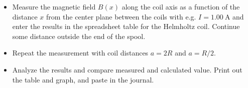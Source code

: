 \documentclass[../Elmag-labhefte-2020.tex]{subfiles}
\begin{document}
\begin{itemize}
\begin{marginfigure}
    \caption{%
        The Helmholtz coil circuit.
        Note that for the coils to be sufficiently close, the coils must be mounted with the connectors pointing out.
        Take care to have the current flow in the same direction in each coil.
    }
    \label{magnetfelt.fig7}
\end{marginfigure}
    \item Measure the magnetic field $B(x)$ along the coil axis as a function of the distance $x$ from the center plane between the coils with e.g. $I = \SI{1.00}{\ampere}$ and enter the results in the spreadsheet table for the Helmholtz coil. Continue some distance outside the end of the spool.
    \item Repeat the measurement with coil distances $a = 2R$ and $a = R/2$.
    \item Analyze the results and compare measured and calculated value. Print out the table and graph, and paste in the journal.
\end{itemize}
\end{document}
